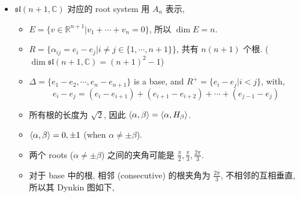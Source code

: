 \begin{itemize}
	\noindent\rule[0.5ex]{\linewidth}{0.5pt} %
	
	\item $\mathfrak{sl}(n + 1, \mathbb{C})$ 对应的 root system 用 $A_n$ 表示,
	\begin{itemize}
		\item $E = \{v \in \mathbb{R}^{n + 1} | v_1 + \cdots + v_n = 0\}$, 所以 $\dim E = n$.
		
		\item $R = \{\alpha_{i j} = e_i - e_j | i \neq j \in \{1, \cdots, n + 1\}\}$, 共有 $n (n + 1)$ 个根. ($\dim \mathfrak{sl}(n + 1, \mathbb{C}) = (n + 1)^2 - 1$)
		
		\item $\Delta = \{e_1 - e_2, \cdots, e_n - e_{n + 1}\}$ is a base, and $R^+ = \{e_i - e_j | i < j\}$, with,
		\begin{equation}
			e_i - e_j = (e_i - e_{i + 1}) + (e_{i + 1} - e_{i + 2}) + \cdots + (e_{j - 1} - e_j)
		\end{equation}
		
		\item 所有根的长度为 $\sqrt{2}$, 因此 $\braket{\alpha, \beta} = \braket{\alpha, H_\beta}$.
		
		\item $\braket{\alpha, \beta} = 0, \pm 1$ (when $\alpha \neq \pm \beta$).
		
		\item 两个 roots ($\alpha \neq \pm \beta$) 之间的夹角可能是 $\frac{\pi}{2}, \frac{\pi}{3}, \frac{2 \pi}{3}$.
		
		\item 对于 base 中的根, 相邻 (consecutive) 的根夹角为 $\frac{2 \pi}{3}$, 不相邻的互相垂直, 所以其 Dynkin 图如下,
		

\end{itemize}
\end{itemize}
